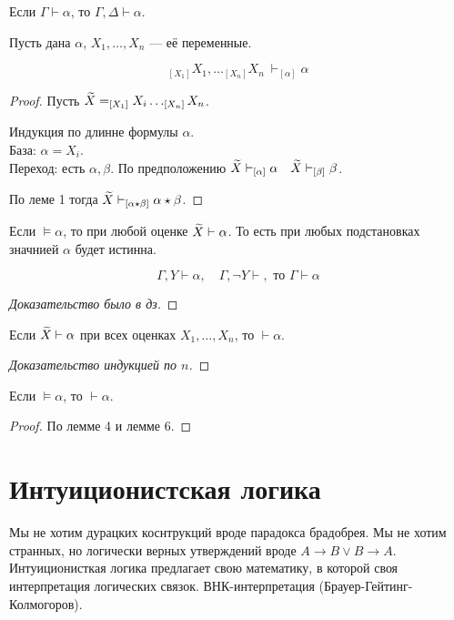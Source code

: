 \begin{lemma}
Если $\Gamma \vdash \alpha$, то $\Gamma, \Delta \vdash \alpha$.
\end{lemma}

\begin{lemma}
Пусть дана $\alpha$, $X_1,\ldots, X_n$ --- её переменные.

\[ _{[X_1]}X_1,\ldots _{[X_n]}X_n\ \vdash _{[\alpha]}\alpha  \]
\end{lemma}
\begin{proof}
    Пусть $\widetilde{X} = _{[X_1]} X_i \dots _{[X_n]} X_n$.

    Индукция по длинне формулы $\alpha$.\\
    База: $\alpha = X_i$.\\
    Переход: есть $\alpha, \beta$. По предположению $\widetilde{X} \vdash _{[\alpha]} \alpha ~~~ \widetilde{X} \vdash _{[\beta]} \beta$.

    По леме 1 тогда  $\widetilde{X} \vdash _{[\alpha \star \beta]} \alpha \star \beta$.
\end{proof}

\begin{lemma}
    Если $\vDash \alpha$, то при любой оценке $\widetilde{X} \vdash \alpha$.
    То есть при любых подстановках значнией $\alpha $ будет истинна.
\end{lemma}

\begin{lemma}
    \[ \Gamma, Y \vdash \alpha, \quad \Gamma, \neg Y \vdash, \text{ то } \Gamma \vdash \alpha \]
\end{lemma}
\begin{proof}[Доказательство было в дз]
\end{proof}

\begin{lemma}
    Если $\widetilde{X} \vdash \alpha$ при всех оценках $X_1, \dots, X_n$, то $\vdash \alpha$.
\end{lemma}
\begin{proof}
    [Доказательство индукцией по $n$]
\end{proof}
\begin{theorem}
    Если $\vDash \alpha$, то $\vdash \alpha$.
\end{theorem}
\begin{proof}
    По лемме 4 и лемме 6.
\end{proof}

\section{Интуиционистская логика}
Мы не хотим дурацких коснтрукций вроде парадокса брадобрея.
Мы не хотим странных, но логически верных утверждений вроде $A\to B \lor B \to A$.
Интуиционисткая логика предлагает свою математику, в которой своя интерпретация логических связок.
ВНК-интерпретация (Брауер-Гейтинг-Колмогоров).

